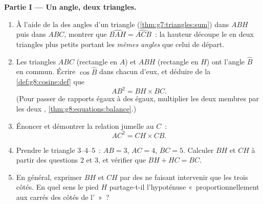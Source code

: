 \begin{problem}[{Devoir maison --- la hauteur d'un triangle
rectangle~: $AB^2 = BH \times BC$, $AH^2 = BH \times HC$, une seconde
démonstration de Pythagore, et une machine à construire des racines
carrées}]
\medskip
\noindent\textbf{Partie I --- Un angle, deux triangles.}
\begin{enumerate}
  \item À l'aide de la  des angles d'un triangle
        (\cref{thm:g7:triangles:sum}) dans $ABH$ puis dans $ABC$,
        montrer que $\widehat{BAH} = \widehat{ACB}$~: la hauteur
        découpe le  en deux triangles plus petits
        portant les \emph{mêmes angles} que celui de départ.
  \item Les triangles $ABC$ (rectangle en $A$) et $ABH$ (rectangle
        en $H$) ont l'angle $\widehat B$ en commun. Écrire
        $\cos\widehat B$ dans chacun d'eux, et déduire de la
        \cref{def:g8:cosine:def} que
        \[
        AB^2 = BH \times BC .
        \]
        (Pour passer de rapports égaux à des  égaux,
        multiplier les deux membres par les deux ,
        \cref{thm:g8:equations:balance}.)
  \item Énoncer et démontrer la relation jumelle au  $C$~:
        \[
        AC^2 = CH \times CB .
        \]
  \item Prendre le triangle $3$--$4$--$5$~: $AB = 3$, $AC = 4$,
        $BC = 5$. Calculer $BH$ et $CH$ à partir des questions 2 et
        3, et vérifier que $BH + HC = BC$.
  \item En général, exprimer $BH$ et $CH$ par des  ne
        faisant intervenir que les trois côtés. En quel sens le pied
        $H$ partage-t-il l'hypoténuse «~proportionnellement aux
        carrés des côtés de l'~»~?
\end{enumerate}


\end{problem}
